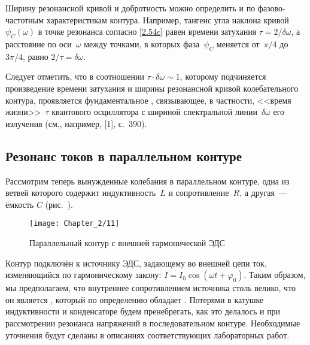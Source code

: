 Ширину резонансной кривой и добротность можно определить и по
фазово-частотным характеристикам контура. Например, тангенс угла наклона
кривой $\psi_C(\omega)$ в точке резонанса согласно \eqref{2.54c} равен времени
затухания $\tau=2/\delta\omega$, а расстояние по оси~$\omega$ между точками, в
которых фаза~$\psi_C$ меняется от~$\pi/4$ до~$3\pi/4$, равно
$2/\tau=\delta\omega$.

Следует отметить, что в соотношении $\tau\cdot\delta\omega\sim1$, которому
подчиняется произведение времени затухания и ширины резонансной кривой
колебательного контура, проявляется фундаментальное , связывающее, в частности, <<время жизни>>~$\tau$ квантового
осциллятора с шириной спектральной линии~$\delta\omega$ его излучения (см.,
например, [1], с.~390).

\subsection{Резонанс токов в параллельном контуре}

Рассмотрим теперь вынужденные колебания в параллельном контуре, одна из ветвей
которого содержит индуктивность~$L$ и сопротивление~$R$, а другая~--- ёмкость
$C$ (рис.~).
\begin{center}
	\begin{figure}[h!]
		\centering\texttt{[image: Chapter\_2/11]}
		\caption{Параллельный контур с внешней гармонической ЭДС}
	\end{figure}
\end{center}

Контур подключён к источнику ЭДС, задающему во внешней цепи ток, изменяющийся по
гармоническому закону: $I=I_0\cos(\omega t+\varphi_0)$. Таким образом, мы
предполагаем, что внутреннее сопротивлением источника столь велико, что он
является , который по определению обладает
. Потерями в катушке
индуктивности и конденсаторе будем пренебрегать, как это делалось и при
рассмотрении резонанса напряжений в последовательном контуре. Необходимые
уточнения будут сделаны в описаниях соответствующих лабораторных работ.

